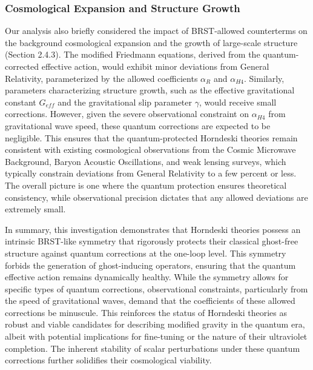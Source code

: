 \documentclass[twocolumn]{aastex631}
\begin{document}
\subsubsection{Cosmological Expansion and Structure Growth}
Our analysis also briefly considered the impact of BRST-allowed counterterms on the background cosmological expansion and the growth of large-scale structure (Section 2.4.3). The modified Friedmann equations, derived from the quantum-corrected effective action, would exhibit minor deviations from General Relativity, parameterized by the allowed coefficients $\alpha_R$ and $\alpha_{H4}$. Similarly, parameters characterizing structure growth, such as the effective gravitational constant $G_{eff}$ and the gravitational slip parameter $\gamma$, would receive small corrections. However, given the severe observational constraint on $\alpha_{H4}$ from gravitational wave speed, these quantum corrections are expected to be negligible. This ensures that the quantum-protected Horndeski theories remain consistent with existing cosmological observations from the Cosmic Microwave Background, Baryon Acoustic Oscillations, and weak lensing surveys, which typically constrain deviations from General Relativity to a few percent or less. The overall picture is one where the quantum protection ensures theoretical consistency, while observational precision dictates that any allowed deviations are extremely small.

In summary, this investigation demonstrates that Horndeski theories possess an intrinsic BRST-like symmetry that rigorously protects their classical ghost-free structure against quantum corrections at the one-loop level. This symmetry forbids the generation of ghost-inducing operators, ensuring that the quantum effective action remains dynamically healthy. While the symmetry allows for specific types of quantum corrections, observational constraints, particularly from the speed of gravitational waves, demand that the coefficients of these allowed corrections be minuscule. This reinforces the status of Horndeski theories as robust and viable candidates for describing modified gravity in the quantum era, albeit with potential implications for fine-tuning or the nature of their ultraviolet completion. The inherent stability of scalar perturbations under these quantum corrections further solidifies their cosmological viability.
\end{document}
